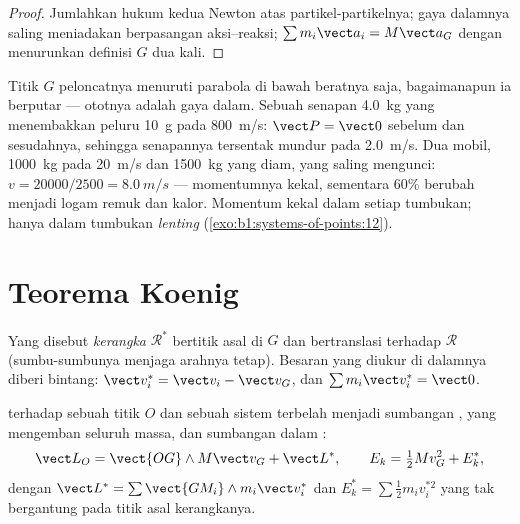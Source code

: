 \begin{proof}
Jumlahkan hukum kedua Newton atas partikel-partikelnya; gaya dalamnya
saling meniadakan berpasangan aksi--reaksi; $\sum m_i\vect a_i = M\vect a_G$ dengan
menurunkan definisi $G$ dua kali.
\end{proof}

\begin{example}\label{ex:b1:systems-of-points:cm}
Titik $G$ peloncatnya menuruti parabola di bawah beratnya saja, bagaimanapun ia
berputar --- ototnya adalah gaya dalam. Sebuah senapan \qty{4.0}{kg}
yang menembakkan peluru \qty{10}{g} pada \qty{800}{m/s}: $\vect P = \vect 0$ sebelum
dan sesudahnya, sehingga senapannya tersentak mundur pada \qty{2.0}{m/s}. Dua mobil, \qty{1000}{kg}
pada \qty{20}{m/s} dan \qty{1500}{kg} yang diam, yang saling mengunci: $v =
20000/2500 = \qty{8.0}{m/s}$ --- momentumnya kekal, sementara $60\%$
 berubah menjadi logam remuk dan kalor. Momentum kekal
dalam setiap tumbukan;  hanya dalam tumbukan \emph{lenting}
(\cref{exo:b1:systems-of-points:12}).
\end{example}

\section{Teorema Koenig}

\begin{definition}\label{def:b1:systems-of-points:barycentric}
Yang disebut \emph{kerangka } $\mathcal R^*$ bertitik asal di $G$ dan
bertranslasi terhadap  $\mathcal R$ (sumbu-sumbunya
menjaga arahnya tetap). Besaran yang diukur di dalamnya diberi bintang: $\vect v_i^*
= \vect v_i - \vect v_G$, dan $\sum m_i\vect v_i^* = \vect 0$.
\end{definition}

\begin{theorem}\label{thm:b1:systems-of-points:koenig}
 terhadap sebuah titik $O$ dan  sebuah
sistem terbelah menjadi sumbangan , yang mengemban
seluruh massa, dan sumbangan dalam :
\[
\vect L_O = \vect{OG}\wedge M\vect v_G + \vect L^*, \qquad
E_k = \tfrac12 Mv_G^2 + E_k^*,
\]
dengan $\vect L^* = \sum\vect{GM_i}\wedge m_i\vect v_i^*$ dan $E_k^* = \sum\tfrac12
m_iv_i^{*2}$ yang tak bergantung pada titik asal kerangkanya.
\end{theorem}

